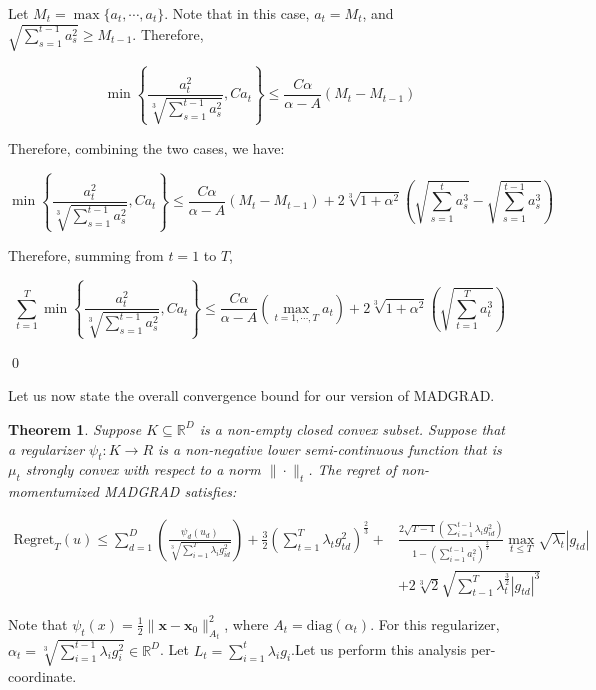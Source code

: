 \documentclass{article}
\newtheorem{theorem}{Theorem}[section]
\newcommand{\R}{\mathbb{R}}
\newcommand{\Regret}{\text{Regret}}
\newcommand{\diag}{\text{diag}}
\newcommand{\bx}{\mathbf{x}}
\begin{document}
Let $M_t = \max \{a_t, \cdots, a_t\}$. Note that in this case, $a_t = M_t$, and $\sqrt{\sum\limits_{s=1}^{t-1} a_{s}^2}
\geq M_{t-1}$. Therefore,

\[
  \min \left\{ \frac{a_{t}^2}{\sqrt[3]{\sum\limits_{s=1}^{t-1} a_{s}^2}}, C a_t \right\} \leq 
  \frac{C \alpha}{\alpha - A}\left(M_t - M_{t-1}\right)
\]

Therefore, combining the two cases, we have:

\[
  \min \left\{ \frac{a_{t}^2}{\sqrt[3]{\sum\limits_{s=1}^{t-1} a_{s}^2}}, C a_t \right\} \leq \frac{C \alpha}{\alpha -
  A}\left(M_t - M_{t-1}\right) + 2 \sqrt[3]{1 + \alpha^2}\left(\sqrt{\sum\limits_{s=1}^t a_{s}^3} -
  \sqrt{\sum\limits_{s=1}^{t-1} a_{s}^3}\right)
\]

Therefore, summing from $t=1$ to $T$,

\[
  \sum\limits_{t=1}^T\min \left\{ \frac{a_{t}^2}{\sqrt[3]{\sum\limits_{s=1}^{t-1} a_{s}^2}}, C a_t \right\} \leq \frac{C \alpha}{\alpha -
  A}\left(\max\limits_{t=1, \cdots, T} a_t\right) + 2 \sqrt[3]{1 + \alpha^2}\left(\sqrt{\sum\limits_{t=1}^T a_{t}^3}\right)
\]

\qed

Let us now state the overall convergence bound for our version of MADGRAD.

\begin{theorem}
  Suppose $K \subseteq \R^D$ is a non-empty closed convex subset. Suppose that a regularizer $\psi_t: K \rightarrow R$
  is a non-negative lower semi-continuous function that is $\mu_t$ strongly convex with respect to a norm $\| \cdot
  \|_t$. The regret of non-momentumized MADGRAD satisfies:

  \begin{align*}
    \Regret_T(u) \leq \sum\limits_{d=1}^D \left(\frac{\psi_d(u_d)}{\sqrt[3]{\sum\limits_{i=1}^{T} \lambda_i
      g_{id}^2}}\right) + \frac{3}{2}\left(\sum\limits_{t=1}^T \lambda_t g_{td}^2\right)^\frac{2}{3} +& \frac{2
      \sqrt{T-1}\left(\sum_{i=1}^{t-1} \lambda_i g_{id}^2\right)}{1 - \left( \sum_{i=1}^{t-1} a_{i}^2
    \right)^\frac{2}{3}} \max_{t \leq T} \sqrt{\lambda_t}|g_{td}| \\ &+ 2\sqrt[3]{2}\sqrt{\sum\limits_{t-1}^T
    \lambda_t^\frac{3}{2} |g_{td}|^3}
  \end{align*}
\end{theorem}

\proof Note that $\psi_t (x) = \frac{1}{2} \| \bx - \bx_0\|_{A_t}^2$, where $A_t = \diag(\alpha_t)$. For this
regularizer, $\alpha_t = \sqrt[3]{\sum\limits_{i=1}^{t-1} \lambda_i g_{i}^2} \in \R^D$. Let $L_t = \sum\limits_{i=1}^t
\lambda_i g_i$.Let us perform this analysis per-coordinate.
\end{document}

